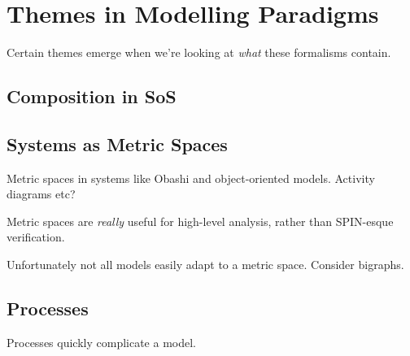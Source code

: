 \section{Themes in Modelling Paradigms}
Certain themes emerge when we're looking at \emph{what} these formalisms contain.


\subsection{Composition in SoS}


\subsection{Systems as Metric Spaces}
Metric spaces in systems like Obashi and object-oriented models. Activity diagrams etc?
\par

Metric spaces are \emph{really} useful for high-level analysis, rather than SPIN-esque verification.
\par

Unfortunately not all models easily adapt to a metric space. Consider bigraphs.
\par

\subsection{Processes}
Processes quickly complicate a model.


